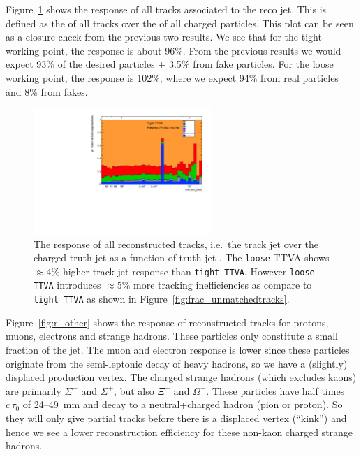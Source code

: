 %
%


Figure~\ref{fig:r_trackjet} shows the response of all tracks associated to the reco jet. This is defined as the \pt{} of all tracks over the \pt{} of all charged particles.
This plot can be seen as a closure check from the previous two results. We see that for the tight working point, the response is about 96\%. From the previous results we would expect 93\% of the desired particles + 3.5\% from fake particles. For the loose working point, the response is 102\%, where we expect 94\% from real particles and 8\% from fakes.

\begin{figure}[tb]
\centering
\includegraphics[width=0.6\textwidth,page=17]{figures/jet_comp_study_powheg_Tight_pTFraction_mc16e.pdf}
\caption {The response of all reconstructed tracks, i.e.\ the track jet \pt{} over the charged truth jet \pt{} as a function of truth jet \pt{}. 
The \texttt{loose} TTVA shows $\approx 4$\% higher track jet response than \texttt{tight TTVA}. However \texttt{loose TTVA} introduces $\approx 5$\% more tracking inefficiencies as compare to \texttt{tight TTVA} as shown in Figure~\ref{fig:frac_unmatchedtracks}.}
\label{fig:r_trackjet}
\end{figure}


%
%





Figure~\ref{fig:r_other} shows the \pt{} response of reconstructed tracks for protons, muons, electrons and strange hadrons.
These particles only constitute a small fraction of the jet.
The muon and electron response is lower since these particles originate from the semi-leptonic decay of heavy hadrons, so we have a (slightly) displaced production vertex.
The charged strange hadrons (which excludes kaons) are primarily $\Sigma^-$ and $\Sigma^+$, but also $\Xi^-$ and $\Omega^-$. These particles have half times $c\,\tau_0$ of 24--49~mm and decay to a neutral+charged hadron (pion or proton). So they will only give partial tracks before there is a displaced vertex (``kink'') and hence we see a lower reconstruction efficiency for these non-kaon charged strange hadrons.


